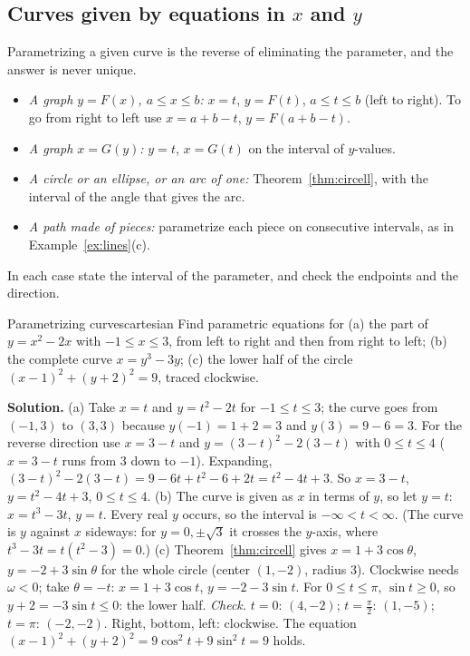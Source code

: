 \documentclass[11pt]{article}
\begin{document}
\subsection*{Curves given by equations in $x$ and $y$}

Parametrizing a given curve is the reverse of eliminating the parameter, and the answer is never unique.
\begin{itemize}[nosep]
  \item \emph{A graph $y=F(x)$, $a\le x\le b$:} $x=t$, $y=F(t)$, $a\le t\le b$ (left to right). To go from right to left use $x=a+b-t$, $y=F(a+b-t)$.
  \item \emph{A graph $x=G(y)$:} $y=t$, $x=G(t)$ on the interval of $y$-values.
  \item \emph{A circle or an ellipse, or an arc of one:} Theorem~\ref{thm:circell}, with the interval of the angle that gives the arc.
  \item \emph{A path made of pieces:} parametrize each piece on consecutive intervals, as in Example~\ref{ex:lines}(c).
\end{itemize}
In each case state the interval of the parameter, and check the endpoints and the direction.

\begin{exmp}{Parametrizing curves}{cartesian}
Find parametric equations for (a) the part of $y=x^2-2x$ with $-1\le x\le3$, from left to right and then from right to left; (b) the complete curve $x=y^3-3y$; (c) the lower half of the circle $(x-1)^2+(y+2)^2=9$, traced clockwise.

\textbf{Solution.} (a) Take $x=t$ and $y=t^2-2t$ for $-1\le t\le3$; the curve goes from $(-1,3)$ to $(3,3)$ because $y(-1)=1+2=3$ and $y(3)=9-6=3$. For the reverse direction use $x=3-t$ and $y=(3-t)^2-2(3-t)$ with $0\le t\le4$ ($x=3-t$ runs from $3$ down to $-1$). Expanding, $(3-t)^2-2(3-t)=9-6t+t^2-6+2t=t^2-4t+3$. So $x=3-t$, $y=t^2-4t+3$, $0\le t\le4$.
(b) The curve is given as $x$ in terms of $y$, so let $y=t$: $x=t^3-3t$, $y=t$. Every real $y$ occurs, so the interval is $-\infty<t<\infty$. (The curve is $y$ against $x$ sideways: for $y=0,\pm\sqrt3$ it crosses the $y$-axis, where $t^3-3t=t(t^2-3)=0$.)
(c) Theorem~\ref{thm:circell} gives $x=1+3\cos\theta$, $y=-2+3\sin\theta$ for the whole circle (center $(1,-2)$, radius $3$). Clockwise needs $\omega<0$; take $\theta=-t$: $x=1+3\cos t$, $y=-2-3\sin t$. For $0\le t\le\pi$, $\sin t\ge0$, so $y+2=-3\sin t\le0$: the lower half. \emph{Check.} $t=0$: $(4,-2)$; $t=\frac\pi2$: $(1,-5)$; $t=\pi$: $(-2,-2)$. Right, bottom, left: clockwise. The equation $(x-1)^2+(y+2)^2=9\cos^2t+9\sin^2t=9$ holds.
\end{exmp}
\end{document}
